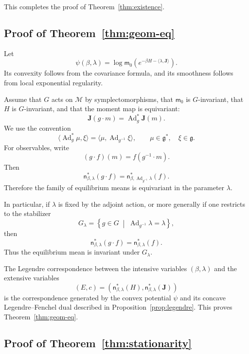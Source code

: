 \documentclass[11pt,reqno]{amsart}
\begin{document}
This completes the proof of Theorem~\ref{thm:existence}.

\subsection{Proof of Theorem~\ref{thm:geom-eq}}

Let
\[
\psi(\beta,\lambda)
=
\log
\mathsf m_0
\left(
e^{-\beta H-\langle\lambda,\mathbf J\rangle}
\right).
\]
Its convexity follows from the covariance formula, and its smoothness
follows from local exponential regularity.

Assume that $G$ acts on $\mathcal M$ by symplectomorphisms, that
$\mathsf m_0$ is $G$-invariant, that $H$ is $G$-invariant, and that the
moment map is equivariant:
\[
\mathbf J(g\cdot m)
=
\operatorname{Ad}_g^*\mathbf J(m).
\]
We use the convention
\[
\langle\operatorname{Ad}_g^*\mu,\xi\rangle
=
\langle\mu,\operatorname{Ad}_{g^{-1}}\xi\rangle,
\qquad
\mu\in\mathfrak g^*,
\quad
\xi\in\mathfrak g.
\]
For observables, write
\[
(g\cdot f)(m)
=
f(g^{-1}\cdot m).
\]
Then
\[
\mathsf n_{\beta,\lambda}^*(g\cdot f)
=
\mathsf n_{\beta,\operatorname{Ad}_{g^{-1}}\lambda}^*(f).
\]
Therefore the family of equilibrium means is equivariant in the
parameter $\lambda$.

In particular, if $\lambda$ is fixed by the adjoint action, or more
generally if one restricts to the stabilizer
\[
G_\lambda
=
\left\{
g\in G
\;\middle|\;
\operatorname{Ad}_{g^{-1}}\lambda=\lambda
\right\},
\]
then
\[
\mathsf n_{\beta,\lambda}^*(g\cdot f)
=
\mathsf n_{\beta,\lambda}^*(f).
\]
Thus the equilibrium mean is invariant under $G_\lambda$.

The Legendre correspondence between the intensive variables
$(\beta,\lambda)$ and the extensive variables
\[
(E,c)
=
\left(
\mathsf n_{\beta,\lambda}^*(H),
\mathsf n_{\beta,\lambda}^*(\mathbf J)
\right)
\]
is the correspondence generated by the convex potential $\psi$ and its
concave Legendre--Fenchel dual described in
Proposition~\ref{prop:legendre}. This proves
Theorem~\ref{thm:geom-eq}.

\subsection{Proof of Theorem~\ref{thm:stationarity}}
\end{document}

